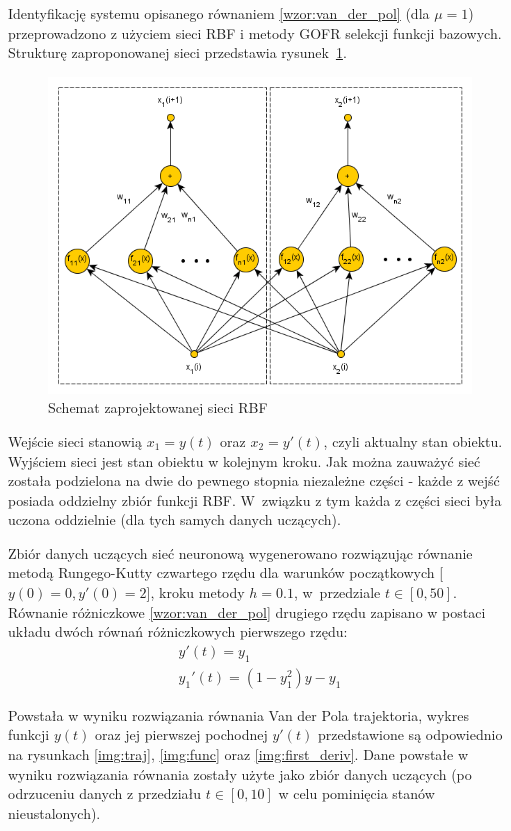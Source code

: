 Identyfikację systemu opisanego równaniem \eqref{wzor:van_der_pol} (dla $\mu = 1$) przeprowadzono z użyciem sieci RBF i metody GOFR selekcji funkcji bazowych. Strukturę zaproponowanej sieci przedstawia rysunek~\ref{fig:rbf}.
\begin{figure}[ht!]
	\centering
	
	\includegraphics[width = \textwidth]{images/rbf.png}
	\caption{Schemat zaprojektowanej sieci RBF}
	\label{fig:rbf}	

\end{figure}
Wejście sieci stanowią $x_1 = y(t)$ oraz $x_2 = y'(t)$, czyli aktualny stan obiektu. Wyjściem sieci jest stan obiektu w kolejnym kroku. Jak można zauważyć sieć została podzielona na dwie do pewnego stopnia niezależne części - każde z wejść posiada oddzielny zbiór funkcji RBF. W~związku z tym każda z części sieci była uczona oddzielnie (dla tych samych danych uczących). 

Zbiór danych uczących sieć neuronową wygenerowano rozwiązując równanie metodą Rungego-Kutty czwartego rzędu dla warunków początkowych [$y(0)=0,y'(0)=2$], kroku metody $h=0.1$, w~przedziale $t \in [0,50]$. Równanie różniczkowe \eqref{wzor:van_der_pol} drugiego rzędu zapisano w postaci układu dwóch równań różniczkowych pierwszego rzędu:
\begin{equation}
	\begin{array}{l}
    y'(t)  = y_1 \\
    y_1'(t) = (1-y_1^2)y-y_1
    \end{array}
\end{equation}

Powstała w wyniku rozwiązania równania Van der Pola trajektoria, wykres funkcji $y(t)$ oraz jej pierwszej pochodnej $y'(t)$ przedstawione są odpowiednio na rysunkach \ref{img:traj}, \ref{img:func} oraz \ref{img:first_deriv}. Dane powstałe w wyniku rozwiązania równania zostały użyte jako zbiór danych uczących (po odrzuceniu danych z przedziału $t \in [0,10]$ w celu pominięcia stanów nieustalonych).

